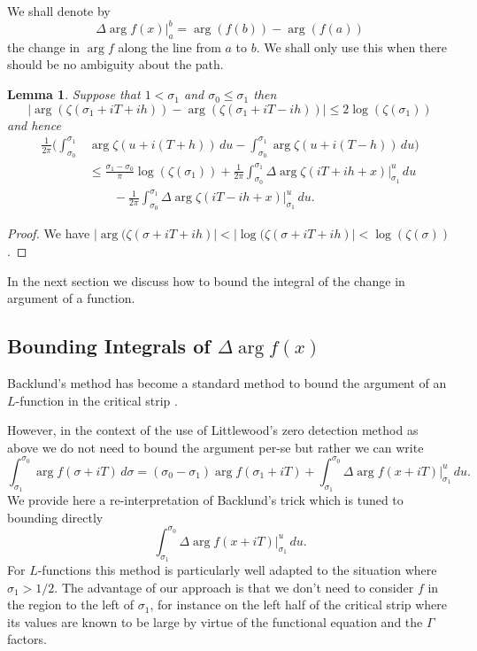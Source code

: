 \documentclass[10pt,english,letter, reqno]{amsart}
\theoremstyle{plain}
\newtheorem{lemma}[theorem]{Lemma}
\theoremstyle{definition}
\begin{document}
We shall denote by 
\[ \Delta \arg f(x)|_a^b = \arg(f(b)) - \arg(f(a)) \]
the change in $\arg f$ along the line from $a$ to $b$. We shall only use this when there should be no ambiguity about the path.
\begin{lemma}\label{lem:littlewood-argsetup}
   Suppose that $1< \sigma_1$ and $\sigma_0\leq\sigma_1$ then
    \[ |\arg(\zeta(\sigma_1 +iT+ih)) - \arg(\zeta(\sigma_1 +iT-ih))| \leq 2\log(\zeta(\sigma_1)) \]
    and hence
    \begin{align*}
    \frac{1}{2\pi}\Biggl(\int_{\sigma_0}^{\sigma_1} &
     \arg \zeta(u+i(T+h))\,du - \int_{\sigma_0}^{\sigma_1} \arg \zeta(u+i(T-h))\,du \Biggr)\\
    &\leq \frac{\sigma_1-\sigma_0}{\pi}\log(\zeta(\sigma_1)) +
    \frac{1}{2\pi}\int_{\sigma_0}^{\sigma_1} \Delta\arg\zeta(iT+ih+x)|_{\sigma_1}^{u}\,du \\&
     \qquad- \frac{1}{2\pi}\int_{\sigma_0}^{\sigma_1} \Delta\arg\zeta(iT-ih+x)|_{\sigma_1}^{u}\,du.
    \end{align*}
\end{lemma}
\begin{proof}
    We have $|\arg(\zeta(\sigma +iT+ih) | < |\log(\zeta(\sigma +iT+ih) | < \log(\zeta(\sigma))$.
\end{proof}

In the next section we discuss how to bound the integral of the change in argument of a function.

 

\subsection{Bounding Integrals of $\Delta \arg f(x)$}\label{sec:argintegrals}

Backlund's method has become a standard method to bound the argument of an $L$-function in the critical strip \cite{Backlund1916,Trudgian2014,HasanalizadeShenWong2022,BellottiWongFiori2025}. 

However, in the context of the use of Littlewood's zero detection method as above we do not need to bound the argument per-se but rather we can write
\[ \int_{\sigma_1}^{\sigma_0} \arg f(\sigma+iT)\,d\sigma = (\sigma_0- \sigma_1)\arg f(\sigma_1+iT) + \int_{\sigma_1}^{\sigma_0} \Delta\arg f( x + i T)|_{\sigma_1}^u\,du. \]
We provide here a re-interpretation of Backlund's trick which is tuned to bounding directly
\[ \int_{\sigma_1}^{\sigma_0} \Delta\arg f( x + i T)|_{\sigma_1}^u \,du. \]
For $L$-functions this method is particularly well adapted to the situation where $\sigma_1 > 1/2$.
The advantage of our approach is that we don't need to consider $f$ in the region to the left of $\sigma_1$, for instance on the left half of the critical strip where its values are known to be large by virtue of the functional equation and the $\Gamma$ factors.
\end{document}
